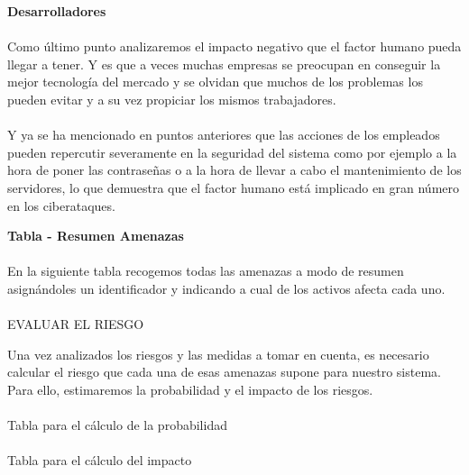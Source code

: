 \textbf{Desarrolladores}
\paragraph{}
Como último punto analizaremos el impacto negativo que el factor humano pueda llegar a tener. Y es que a veces muchas empresas se preocupan en conseguir la mejor tecnología del mercado y se olvidan que muchos de los problemas los pueden evitar y a su vez propiciar los mismos trabajadores.
\paragraph{}
Y ya se ha mencionado en puntos anteriores que las acciones de los empleados pueden repercutir severamente en la seguridad del sistema como por ejemplo a la hora de poner las contraseñas o a la hora de llevar a cabo el mantenimiento de los servidores, lo que demuestra que el factor humano está implicado en gran número en los ciberataques.

\textbf{Tabla - Resumen Amenazas}
\paragraph{}
En la siguiente tabla recogemos todas las amenazas a modo de resumen asignándoles un identificador y indicando a cual de los activos afecta cada uno.



\paragraph{}
EVALUAR EL RIESGO

Una vez analizados los riesgos y las medidas a tomar en cuenta, es necesario calcular el riesgo que cada una de esas amenazas supone para nuestro sistema. Para ello, estimaremos la probabilidad y el impacto de los riesgos.
\paragraph{}
Tabla para el cálculo de la probabilidad
\paragraph{}
Tabla para el cálculo del impacto
